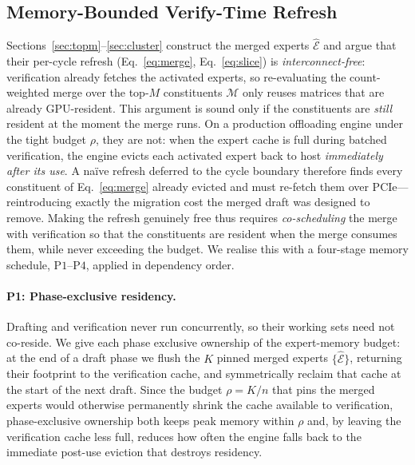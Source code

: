 \subsection{Memory-Bounded Verify-Time Refresh}
\label{sec:verify-merge}

Sections~\ref{sec:topm}--\ref{sec:cluster} construct the merged experts
$\widehat{\mathcal{E}}$ and argue that their per-cycle refresh
(Eq.~\eqref{eq:merge}, Eq.~\eqref{eq:slice}) is \emph{interconnect-free}:
verification already fetches the activated experts, so re-evaluating the
count-weighted merge over the top-$M$ constituents $\mathcal{M}$ only reuses
matrices that are already GPU-resident. This argument is sound only if the
constituents are \emph{still} resident at the moment the merge runs. On a
production offloading engine under the tight budget $\rho$, they are not: when
the expert cache is full during batched verification, the engine evicts each
activated expert back to host \emph{immediately after its use}. A na\"ive refresh
deferred to the cycle boundary therefore finds every constituent of
Eq.~\eqref{eq:merge} already evicted and must re-fetch them over PCIe---
reintroducing exactly the migration cost the merged draft was designed to remove.
Making the refresh genuinely free thus requires \emph{co-scheduling} the merge
with verification so that the constituents are resident when the merge consumes
them, while never exceeding the budget. We realise this with a four-stage memory
schedule, $\mathrm{P1}$--$\mathrm{P4}$, applied in dependency order.

\paragraph{P1: Phase-exclusive residency.}
Drafting and verification never run concurrently, so their working sets need not
co-reside. We give each phase exclusive ownership of the expert-memory budget:
at the end of a draft phase we flush the $K$ pinned merged experts
$\{\widehat{\mathcal{E}}\}$, returning their footprint to the verification cache,
and symmetrically reclaim that cache at the start of the next draft. Since the
budget $\rho=K/n$ that pins the merged experts would otherwise permanently shrink
the cache available to verification, phase-exclusive ownership both keeps peak
memory within $\rho$ and, by leaving the verification cache less full, reduces how
often the engine falls back to the immediate post-use eviction that destroys
residency.

